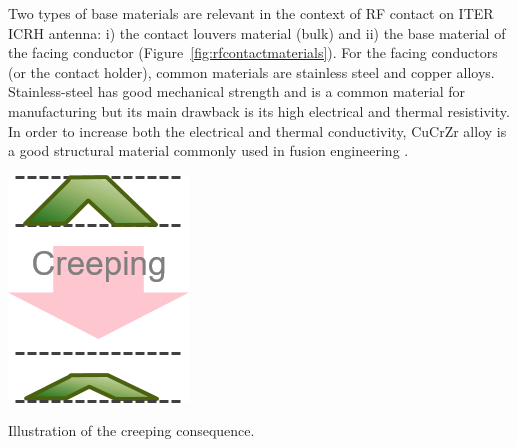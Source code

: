 {Two types of base materials are relevant in the context of RF contact on ITER ICRH antenna: i) the contact louvers material (bulk) and ii) the base material of the facing conductor (Figure~\ref{fig:rfcontactmaterials}). For the facing conductors (or the contact holder), common materials are stainless steel and copper alloys. Stainless-steel has good mechanical strength and is a common material for manufacturing but its main drawback is its high electrical and thermal resistivity. In order to increase both the electrical and thermal conductivity, CuCrZr alloy is a good structural material commonly used in fusion engineering  . 

\begin{marginfigure}
	\centering
	\includegraphics[width=0.6\linewidth]{figures/chap3/RF_contacts/RF_contact_creeping}
	\caption{Illustration of the creeping consequence.}
	\label{fig:rfcontactcreeping}
\end{marginfigure}

}
